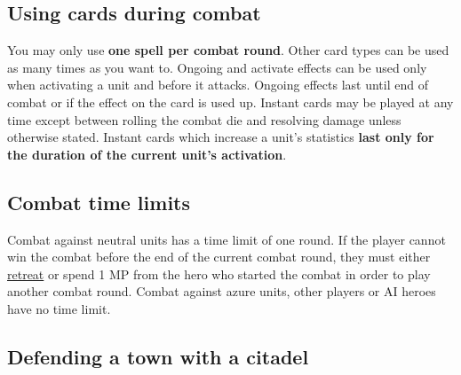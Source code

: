 \subsection*{\hypertarget{CombatCards}{Using cards during combat}}
You may only use \textbf{one spell per combat round}.
Other card types can be used as many times as you want to.
Ongoing  and  activate effects can be used only when activating a unit and before it attacks.
Ongoing effects last until end of combat or if the effect on the card is used up.
Instant  cards may be played at any time except between rolling the combat die and resolving damage unless otherwise stated.
Instant cards which increase a unit's statistics \textbf{last only for the duration of the current unit's activation}.
\subsection*{\hypertarget{Timelimit}{Combat time limits}}
Combat against neutral units has a time limit of one round.
If the player cannot win the combat before the end of the current combat round, they must either \hyperlink{Endcombat}{retreat} or spend 1 MP from the hero who started the combat in order to play another combat round.
Combat against azure units, other players or AI heroes have no time limit.
\clearpage
\subsection*{\hypertarget{Walls}{Defending a town with a citadel}}

